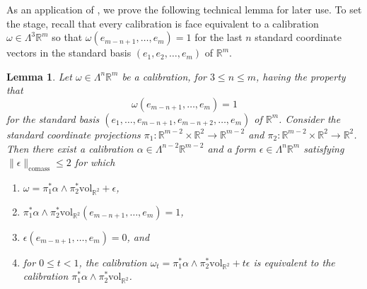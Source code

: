 \documentclass[a4paper,leqno,11pt]{amsart}
\numberwithin{equation}{section}
\newtheorem{lemma}[theorem]{Lemma}
\theoremstyle{remark}
\theoremstyle{remark}
\newcommand{\R}{\mathbb{R}}
\newcommand{\vol}{\mathrm{vol}}
\newcommand{\comass}{\mathrm{comass}}
\begin{document}
As an application of , we prove the following technical lemma for later use. To set the stage, recall that every calibration is face equivalent to a calibration $\omega \in \Lambda^{3}\R^m$ so that $\omega( e_{m-n+1}, \dots, e_{m} ) = 1$ for the last $n$ standard coordinate vectors in the standard basis $(e_1, e_2, \dots, e_{m})$ of $\R^m$.
\begin{lemma}\label{lemm:splitting}
Let $\omega \in \Lambda^{n} \R^m$ be a calibration, for $3 \leq n \leq m$, having the property that 
\[
\omega( e_{m-n+1}, \dots, e_{m} ) = 1
\]
for the standard basis $(e_1, \dots, e_{m-n+1}, e_{m-n+2}, \dots, e_{m})$ of $\R^m$. Consider the standard coordinate projections $\pi_1 \colon \R^{m-2} \times \R^{2} \rightarrow \R^{m-2}$ and $\pi_2 \colon \R^{m-2} \times \R^{2} \rightarrow \R^{2}$. Then there exist a calibration $\alpha \in \Lambda^{n-2} \R^{m-2}$ and a form $\epsilon \in \Lambda^{n} \R^m$ satisfying $\|\epsilon\|_{\comass} \leq 2$ for which 
\begin{enumerate}
\item $\omega = \pi_{1}^{*}\alpha \wedge \pi_{2}^{*}\vol_{ \R^2 } + \epsilon$,
\item $\pi_{1}^{*}\alpha \wedge \pi_{2}^{*}\vol_{ \R^2 }( e_{m-n+1}, \dots, e_{m} ) = 1$,
\item $\epsilon( e_{m-n+1}, \dots, e_{m} ) = 0$, and 
\item for $0\le t <1$, the calibration $\omega_t = \pi_{1}^{*}\alpha \wedge \pi_{2}^{*}\vol_{ \R^2 } + t \epsilon$ is equivalent to the calibration $\pi_{1}^{*}\alpha \wedge \pi_{2}^{*}\vol_{ \R^2 }$.
\end{enumerate}
\end{lemma}
\end{document}
